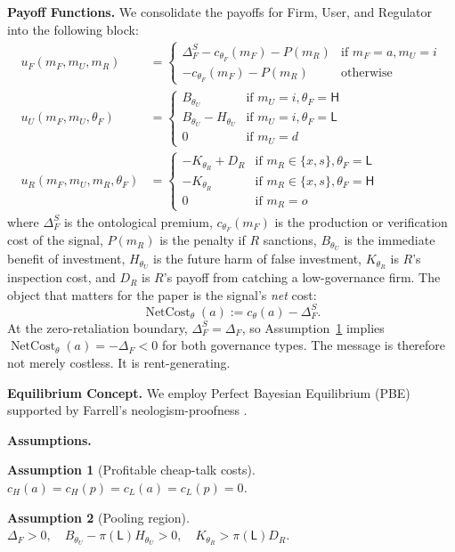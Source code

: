 \documentclass[review,authoryear]{elsarticle}
\newtheorem{assumption}{Assumption}
\theoremstyle{definition}
\theoremstyle{plain}
\begin{document}
\textbf{Payoff Functions.} 
We consolidate the payoffs for Firm, User, and Regulator into the following block:
\begin{align*}
u_F(m_F, m_U, m_R) &= 
\begin{cases}
\Delta_F^S - c_{\theta_F}(m_F) - P(m_R) & \text{if } m_F=a, m_U=i \\
- c_{\theta_F}(m_F) - P(m_R) & \text{otherwise}
\end{cases} \\
u_U(m_F, m_U, \theta_F) &= 
\begin{cases}
B_{\theta_U} & \text{if } m_U=i, \theta_F=\mathsf{H} \\
B_{\theta_U} - H_{\theta_U} & \text{if } m_U=i, \theta_F=\mathsf{L} \\
0 & \text{if } m_U=d
\end{cases} \\
u_R(m_F, m_U, m_R, \theta_F) &=
\begin{cases}
-K_{\theta_R} + D_R & \text{if } m_R \in \{x,s\}, \theta_F=\mathsf{L} \\
-K_{\theta_R} & \text{if } m_R \in \{x,s\}, \theta_F=\mathsf{H} \\
0 & \text{if } m_R = o
\end{cases}
\end{align*}
where $\Delta_F^S$ is the ontological premium, $c_{\theta_F}(m_F)$ is the production or verification cost of the signal, $P(m_R)$ is the penalty if $R$ sanctions, $B_{\theta_U}$ is the immediate benefit of investment, $H_{\theta_U}$ is the future harm of false investment, $K_{\theta_R}$ is $R$'s inspection cost, and $D_R$ is $R$'s payoff from catching a low-governance firm.  The object that matters for the paper is the signal's \emph{net} cost:
\[
\operatorname{NetCost}_{\theta}(a)
:=
c_{\theta}(a)-\Delta_F^S .
\]
At the zero-retaliation boundary, $\Delta_F^S=\Delta_F$, so Assumption~\ref{ass:cheap-talk} implies $\operatorname{NetCost}_{\theta}(a)=-\Delta_F<0$ for both governance types.  The message is therefore not merely costless.  It is rent-generating.

\textbf{Equilibrium Concept.} We employ Perfect Bayesian Equilibrium (PBE) \citep{kreps_wilson1982} supported by Farrell's neologism-proofness \citep{farrell1993}.

\textbf{Assumptions.}
\begin{assumption}[Profitable cheap-talk costs]
\label{ass:cheap-talk}
$c_H(a)=c_H(p)=c_L(a)=c_L(p)=0$.
\end{assumption}
\begin{assumption}[Pooling region]
\label{ass:pooling}
$\Delta_F > 0, \quad B_{\theta_U} - \pi(\mathsf{L})H_{\theta_U} > 0, \quad K_{\theta_R} > \pi(\mathsf{L})D_R$.
\end{assumption}
\end{document}
